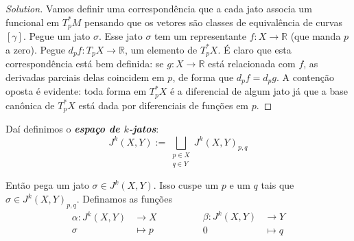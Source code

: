 \begin{proof}[Solution]\leavevmode
Vamos definir uma correspondência que a cada jato associa um funcional em \(T^*_pM\) pensando que os vetores são classes de equivalência de curvas \([\gamma]\). Pegue um jato \(\sigma\). Esse jato \(\sigma\) tem um representante \(f:X \to \mathbb{R}\) (que manda $p$ a zero). Pegue \(d_pf:T_pX \to \mathbb{R}\), um elemento de \(T_p^* X\). É claro que esta correspondência está bem definida: se \(g : X \to \mathbb{R}\) está relacionada com \( f\), as derivadas parciais delas coincidem em $p$, de forma que \(d_pf=d_pg\). A contenção oposta é evidente: toda forma em \(T_p^*X\) é a diferencial de algum jato já que a base canônica de \(T^*_pX\) está dada por diferenciais de funções em $p$.
\end{proof}
Daí definimos o \textit{\textbf{espaço de $k$-jatos}}:
\[J^k(X,Y):= \bigsqcup_{\substack{p \in X \\ q \in Y}}J^k(X,Y)_{p,q}\]

Então pega um jato \(\sigma \in J^k(X,Y)\). Isso cuspe um \(p\) e um  \(q\) tais que  \(\sigma \in J^k(X,Y)_{p,q}\). Definamos as funções
\[\begin{aligned}
	\alpha: J^k(X,Y) &\longrightarrow X \\
	\sigma &\longmapsto p
\end{aligned}\qquad \qquad \begin{aligned}
	\beta: J^k(X,Y) &\longrightarrow Y \\
	0 &\longmapsto q
\end{aligned}\]

